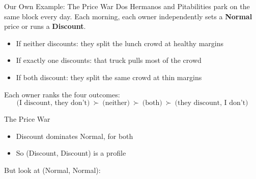 \begin{frame}{Our Own Example: The Price War}
Dos Hermanos and Pitabilities park on the same block every day. Each morning,
each owner independently sets a \textbf{Normal} price or runs a \textbf{Discount}.
\bsk
\begin{itemize}
    \item If neither discounts: they split the lunch crowd at healthy margins
    \item If exactly one discounts: that truck pulls most of the crowd
    \item If both discount: they split the same crowd at thin margins
\end{itemize}
\bsk
Each owner ranks the four outcomes:
$$\text{(I discount, they don't)}\ \succ\ \text{(neither)}\ \succ\ \text{(both)}\ \succ\ \text{(they discount, I don't)}$$
\vspace{-0.4in}
\end{frame}

\begin{frame}{The Price War}
\centering
\begin{matrixgame}[top={Normal, Discount}, left={Normal, Discount}, player names={Dos Hermanos, Pitabilities}, br]
\end{matrixgame}
\bsk
\raggedright
\begin{itemize}
    \item Discount \underline{\hspace{1.4in}} dominates Normal, for both
    \item So (Discount, Discount) is a \underline{\hspace{1.4in}} profile
\end{itemize}
\vfill
But look at (Normal, Normal): \vspace{0.6in}
\end{frame}

